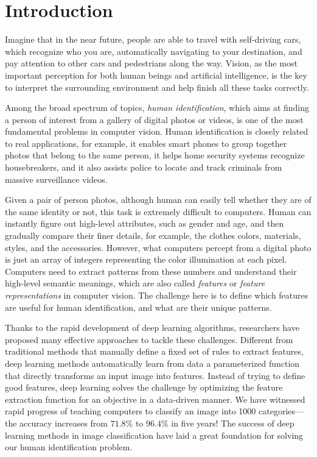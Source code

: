 \chapter{Introduction}
\label{ch:introduction}

Imagine that in the near future, people are able to travel with self-driving cars, which recognize who you are, automatically navigating to your destination, and pay attention to other cars and pedestrians along the way. Vision, as the most important perception for both human beings and artificial intelligence, is the key to interpret the surrounding environment and help finish all these tasks correctly.

Among the broad spectrum of topics, \emph{human identification}, which aims at finding a person of interest from a gallery of digital photos or videos, is one of the most fundamental problems in computer vision. Human identification is closely related to real applications, for example, it enables smart phones to group together photos that belong to the same person, it helps home security systems recognize housebreakers, and it also assists police to locate and track criminals from massive surveillance videos.

Given a pair of person photos, although human can easily tell whether they are of the same identity or not, this task is extremely difficult to computers. Human can instantly figure out high-level attributes, such as gender and age, and then gradually compare their finer details, for example, the clothes colors, materials, styles, and the accessories. However, what computers percept from a digital photo is just an array of integers representing the color illumination at each pixel. Computers need to extract patterns from these numbers and understand their high-level semantic meanings, which are also called \emph{features} or \emph{feature representations} in computer vision. The challenge here is to define which features are useful for human identification, and what are their unique patterns.

Thanks to the rapid development of deep learning algorithms, researchers have proposed many effective approaches to tackle these challenges. Different from traditional methods  that manually define a fixed set of rules to extract features, deep learning methods automatically learn from data a parameterized function that directly transforms an input image into features. Instead of trying to define good features, deep learning solves the challenge by optimizing the feature extraction function for an objective in a data-driven manner. We have witnessed rapid progress of teaching computers to classify an image into 1000 categories---the accuracy increases from $71.8\%$ to $96.4\%$ in five years! The success of deep learning methods in image classification have laid a great foundation for solving our human identification problem.

